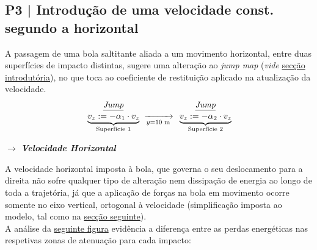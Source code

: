 \clearpage
\subsection{P3 | Introdução de uma velocidade const. segundo a horizontal}
\label{subsec:P3}

A passagem de uma bola saltitante aliada a um movimento horizontal, entre duas superfícies de impacto distintas, sugere uma alteração ao \textit{jump map} (\textit{vide} \hyperref[sec:intro]{secção introdutória}), no que toca ao coeficiente de restituição aplicado na atualização da velocidade.
$$ 
    \begin{aligned}
         &\mspace{36mu}\textit{\underline{Jump}}\\[-0.7ex]
         &\underbrace{v_z := -\alpha_1 \cdot v_z}_{\text{Superfície 1}}
    \end{aligned}
    \;\xrightarrow[y = 10\text{ m}]{}\;
    \begin{aligned}
         &\mspace{36mu}\textit{\underline{Jump}}\\[-0.7ex]
         &\underbrace{v_z := -\alpha_2 \cdot v_z}_{\text{Superfície 2}}
    \end{aligned}
$$

%

\vspace{1em}
\noindent $\pmb{\rightarrow}$ \textit{\textbf{Velocidade Horizontal}}

\noindent A velocidade horizontal imposta à bola, que governa o seu deslocamento para a direita não sofre qualquer tipo de alteração nem dissipação de energia ao longo de toda a trajetória, já que a aplicação de forças na bola em movimento ocorre somente no eixo vertical, ortogonal à velocidade (simplificação imposta ao modelo, tal como na \hyperref[subsec:P4]{secção seguinte}).
\\[6pt]
A análise da \hyperref[fig:2Pav]{seguinte figura} evidência a diferença entre as perdas energéticas nas respetivas zonas de atenuação para cada impacto:

